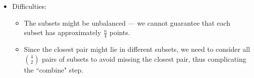 \documentclass[mathserif]{beamer}
\begin{document}
{\begin{itemize}

\item Difficulties: 
	\begin{itemize}
		\item 
The subsets might be unbalanced  --- we cannot guarantee that each subset has approximately $\frac{n}{4}$ points. 
		\item Since the closest pair might lie in different subsets, we need to consider all ${4}\choose{2}$ pairs of subsets to avoid missing the closest pair, thus complicating  the ``combine" step. 
	\end{itemize}

\end{itemize}

}

\end{document}

